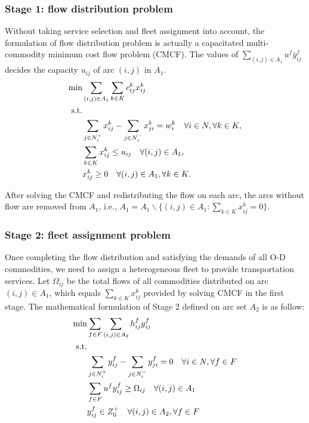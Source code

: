 \documentclass[11pt,nonblindrev,fleqn]{article}
\begin{document}
\subsubsection{Stage 1: flow distribution problem}
Without taking service selection and fleet assignment into account, the formulation of flow distribution problem is actually a capacitated multi-commodity minimum cost flow problem (CMCF). The values of $\sum_{(i,j)\in A_1}u^f \bar{y}_{ij}^f $ decides the capacity $u_{ij}$ of arc $(i,j)$ in $A_1$.
\begin{align}
   \min& \sum_{(i,j)\in A_1}\sum_{k\in K} c_{ij}^k x_{ij}^k     \\
   \rm{s.t.} & \nonumber \\
         &  \sum_{j\in N_i^+}x_{ij}^k - \sum_{j\in N_i^-}x_{ji}^k = w_i^k     \quad      \forall i\in N, \forall k\in K,  \\
         &  \sum_{k\in K} x_{ij}^k \leq u_{ij}      \quad    \forall (i,j)\in A_1,  \\
        &  x_{ij}^k \geq 0   \quad    \forall (i,j)\in A_1, \forall k\in K.
\end{align}

After solving the CMCF and redistributing the flow on each arc, the arcs without flow are removed from $A_1$, i.e., $A_1 = A_1 \backslash  \{ (i,j)\in A_1 : \sum_{k\in K} x_{ij}^k =0 \}$.

\subsubsection{Stage 2: fleet assignment problem}
Once completing the flow distribution and satisfying the demands of all O-D commodities, we need to assign a heterogeneous fleet to provide transportation services. Let $\Omega_{ij}$ be the total flows of all commodities distributed on arc $(i,j) \in A_1$, which equals $\sum_{k\in K}x_{ij}^k$ provided by solving CMCF in the first stage. The mathematical formulation of Stage 2 defined on arc set $A_2$ is as follow:
\begin{align}
  \min & \sum_{f\in F}\sum_{(i,j)\in A_2} h_{ij}^f y_{ij}^f \\
    \rm{s.t.} & \nonumber \\
     & \sum_{j\in N_i^+}y_{ij}^f - \sum_{j\in N_i^-}y_{ji}^f = 0     \quad      \forall i\in N,\forall f\in F  \\
     & \sum_{f\in F} u^f y_{ij}^f \geq \Omega_{ij}      \quad       \forall (i,j)\in A_1   \label{cap} \\
     & y_{ij}^f \in Z_0^+       \quad       \forall (i,j)\in A_2, \forall f\in F
\end{align}
\end{document}
